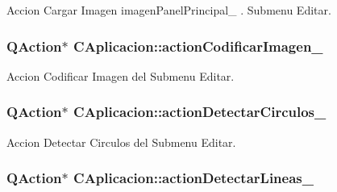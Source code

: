 Accion Cargar Imagen imagen\+Panel\+Principal\+\_\+ . Submenu Editar. 

\subsubsection[{\texorpdfstring{action\+Codificar\+Imagen\+\_\+}{actionCodificarImagen_}}]{\setlength{\rightskip}{0pt plus 5cm}Q\+Action$\ast$ C\+Aplicacion\+::action\+Codificar\+Imagen\+\_\+\hspace{0.3cm}{\ttfamily [private]}}\hypertarget{classCAplicacion_a06464c87dd4924cc8bb92f946239f603}{}\label{classCAplicacion_a06464c87dd4924cc8bb92f946239f603}


Accion Codificar Imagen del Submenu Editar. 

\subsubsection[{\texorpdfstring{action\+Detectar\+Circulos\+\_\+}{actionDetectarCirculos_}}]{\setlength{\rightskip}{0pt plus 5cm}Q\+Action$\ast$ C\+Aplicacion\+::action\+Detectar\+Circulos\+\_\+\hspace{0.3cm}{\ttfamily [private]}}\hypertarget{classCAplicacion_ab4c2fb6ecc5d7c21a1f181f0f0af2830}{}\label{classCAplicacion_ab4c2fb6ecc5d7c21a1f181f0f0af2830}


Accion Detectar Circulos del Submenu Editar. 

\subsubsection[{\texorpdfstring{action\+Detectar\+Lineas\+\_\+}{actionDetectarLineas_}}]{\setlength{\rightskip}{0pt plus 5cm}Q\+Action$\ast$ C\+Aplicacion\+::action\+Detectar\+Lineas\+\_\+\hspace{0.3cm}{\ttfamily [private]}}\hypertarget{classCAplicacion_a5b6d0af534cc0f64dfb7598faa30f3ae}{}\label{classCAplicacion_a5b6d0af534cc0f64dfb7598faa30f3ae}


